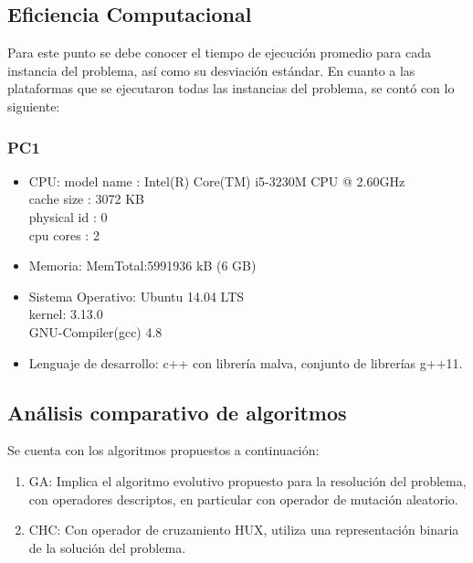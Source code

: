 \documentclass[journal]{IEEEtran}
\begin{document}
\subsection{Eficiencia Computacional}
Para este punto se debe conocer el tiempo de ejecución promedio para cada instancia del problema, así como su desviación estándar.
En cuanto a las plataformas que se ejecutaron todas las instancias del problema, se contó con lo siguiente:
\subsubsection{PC1}

\begin{itemize}
  \item CPU: model name	: Intel(R) Core(TM) i5-3230M CPU @ 2.60GHz\\
    cache size	: 3072 KB\\
    physical id	: 0\\
    cpu cores	: 2
 \item Memoria: MemTotal:5991936 kB (6 GB)
 \item Sistema Operativo: Ubuntu 14.04 LTS \\ kernel: 3.13.0 \\GNU-Compiler(gcc) 4.8 
 \item Lenguaje de desarrollo: c++ \cite{g++} con librería malva\cite{url:malva}, conjunto de librerías g++11. 
\end{itemize}

\subsection{Análisis comparativo de algoritmos}


Se cuenta con los algoritmos propuestos a continuación:
\begin{enumerate}
  \item GA: Implica el algoritmo evolutivo propuesto para la resolución del problema, con operadores descriptos, en particular con operador de mutación aleatorio.
  \item CHC: Con operador de cruzamiento HUX, utiliza una representación binaria de la solución del problema. \cite{url:binaria}
\end{enumerate}
\end{document}
